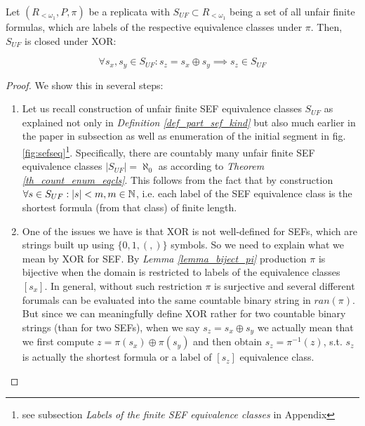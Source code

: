 \begin{lemma}\label{lemma_xorcls_uf}
  Let $(R_{<\omega_1}, P, \pi)$ be a replicata with $S_{UF} \subset R_{<\omega_1}$ being a set of all unfair finite formulas, which are labels of the respective equivalence classes under $\pi$. Then, $S_{UF}$ is closed under XOR:

  \[ \forall s_x,s_y \in S_{UF}: s_z = s_x \oplus s_y \implies s_z \in S_{UF} \] 
\end{lemma}
\begin{proof}
  We show this in several steps: 
  \begin{enumerate}[label=(\roman*)]
    \item Let us recall construction of unfair finite SEF equivalence classes $S_{UF}$ as explained not only in \textit{Definition \ref{def_part_sef_kind}} but also much earlier in the paper in subsection \textit{} as well as enumeration of the initial segment in fig. \ref{fig:sefseq}\footnote{see subsection \textit{Labels of the finite SEF equivalence classes} in Appendix}. Specifically, there are countably many unfair finite SEF equivalence classes $|S_{UF}| = \aleph_0$ as according to \textit{Theorem \ref{th_count_enum_eqcls}}. This follows from the fact that by construction $\forall s \in S_{UF}: |s| < m, m \in \mathbb{N} $, i.e. each label of the SEF equivalence class is the shortest formula (from that class) of finite length.
    \item One of the issues we have is that XOR is not well-defined for SEFs, which are strings built up using $\{0,1,(,)\}$ symbols. So we need to explain what we mean by XOR for SEF. By \textit{Lemma \ref{lemma_biject_pi}} production $\pi$ is bijective when the domain is restricted to labels of the equivalence classes $[s_x]$. In general, without such restriction $\pi$ is surjective and several different forumals can be evaluated into the same countable binary string in $ran(\pi)$. But since we can meaningfully define XOR rather for two countable binary strings (than for two SEFs), when we say $s_z = s_x \oplus s_y$ we actually mean that we first compute $z = \pi(s_x) \oplus \pi(s_y)$ and then obtain $s_z = \pi^{-1}(z)$, s.t. $s_z$ is actually the shortest formula or a label of $[s_z]$ equivalence class. 

\end{enumerate}
\end{proof}
